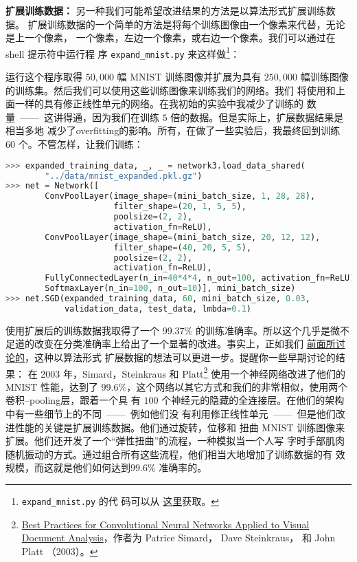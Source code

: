 \textbf{扩展训练数据：} 另一种我们可能希望改进结果的方法是以算法形式扩展训练数据。
扩展训练数据的一个简单的方法是将每个训练图像由一个像素来代替，无论是上一个像素，
一个像素，左边一个像素，或右边一个像素。我们可以通过在 shell 提示符中运行程
序 \lstinline!expand_mnist.py! 来这样做\footnote{\lstinline!expand_mnist.py! 的代
  码可以从%
  \href{https://github.com/mnielsen/neural-networks-and-deep-learning/blob/master/src/expand_mnist.py}{%
    这里}获取。}：

运行这个程序取得 $50,000$ 幅 MNIST 训练图像并扩展为具有
$250,000$ 幅训练图像的训练集。然后我们可以使用这些训练图像来训练我们的网络。我们
将使用和上面一样的具有修正线性单元的网络。在我初始的实验中我减少了训练\epochs{}的
数量~——~这讲得通，因为我们在训练 $5$ 倍的数据。但是实际上，扩展数据结果是相当多地
减少了\gls*{overfitting}的影响。所有，在做了一些实验后，我最终回到训练
$60$ 个\epochs{}。不管怎样，让我们训练：
\begin{lstlisting}[language=Python]
>>> expanded_training_data, _, _ = network3.load_data_shared(
        "../data/mnist_expanded.pkl.gz")
>>> net = Network([
        ConvPoolLayer(image_shape=(mini_batch_size, 1, 28, 28), 
                      filter_shape=(20, 1, 5, 5), 
                      poolsize=(2, 2), 
                      activation_fn=ReLU),
        ConvPoolLayer(image_shape=(mini_batch_size, 20, 12, 12), 
                      filter_shape=(40, 20, 5, 5), 
                      poolsize=(2, 2), 
                      activation_fn=ReLU),
        FullyConnectedLayer(n_in=40*4*4, n_out=100, activation_fn=ReLU),
        SoftmaxLayer(n_in=100, n_out=10)], mini_batch_size)
>>> net.SGD(expanded_training_data, 60, mini_batch_size, 0.03, 
            validation_data, test_data, lmbda=0.1)
\end{lstlisting}

使用扩展后的训练数据我取得了一个 99.37\% 的训练准确率。所以这个几乎是微不足道的改变在分类准确率上给出了一个显著的改进。事实上，正如我们%
\hyperref[sec:other_techniques_for_regularization]{前面所讨论的}，这种以算法形式
扩展数据的想法可以更进一步。提醒你一些早期讨论的结果：
在 2003 年，Simard，Steinkraus 和
Platt\footnote{\href{http://dx.doi.org/10.1109/ICDAR.2003.1227801}{Best
    Practices for Convolutional Neural Networks Applied to Visual Document
    Analysis}，作者为 Patrice Simard， Dave Steinkraus， 和 John
  Platt （2003）。} 使用一个神经网络改进了他们的 MNIST 性能，达到了
$99.6$\%，这个网络以其它方式和我们的非常相似，使用两个卷积--\gls*{pooling}层，跟着一个具
有 $100$ 个神经元的隐藏的全连接层。在他们的架构中有一些细节上的不同~——~例如他们没
有利用修正线性单元~——~但是他们改进性能的关键是扩展训练数据。他们通过旋转，位移和
扭曲 MNIST 训练图像来扩展。他们还开发了一个“弹性扭曲”的流程，一种模拟当一个人写
字时手部肌肉随机振动的方式。通过组合所有这些流程，他们相当大地增加了训练数据的有
效规模，而这就是他们如何达到$99.6$\% 准确率的。

